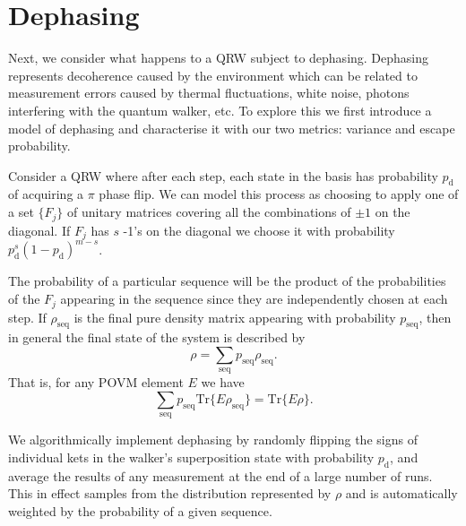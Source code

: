 \documentclass[aps,pra,twocolumn,amsmath,amssymb,nofootinbib,superscriptaddress]{revtex4}
\begin{document}

\section{Dephasing}

Next, we consider what happens to a QRW subject to dephasing. Dephasing represents decoherence caused by the environment which can be related to measurement errors caused by thermal fluctuations, white noise, photons interfering with the quantum walker, etc. To explore this we first introduce a model of dephasing and characterise it with our two metrics: variance and escape probability. 

Consider a QRW where after each step, each state in the basis has probability $p_{\mathrm{d}}$ of acquiring a $\pi$ phase flip. We can model this process as choosing to apply one of a set $\{F_j\}$ of unitary matrices covering all the combinations of $\pm 1$ on the diagonal. If $F_j$ has $s$ -1's on the diagonal we choose it with probability $p_{\mathrm{d}}^s(1-p_{\mathrm{d}})^{m-s}$. 

The probability of a particular sequence will be the product of the probabilities of the $F_j$ appearing in the sequence since they are independently chosen at each step. If $\rho_\mathrm{seq}$ is the final pure density matrix appearing with probability $p_\mathrm{seq}$, then in general the final state of the system is described by
\begin{equation}
    \rho = \sum_\mathrm{seq} p_\mathrm{seq} \rho_\mathrm{seq}.
\end{equation}
That is, for any POVM element $E$ we have 
\begin{equation}
    \sum_\mathrm{seq} p_\mathrm{seq} \mathrm{Tr}\{E \rho_\mathrm{seq}\} = \mathrm{Tr}\{E \rho\}.
\end{equation}

We algorithmically implement dephasing by randomly flipping the signs of individual kets in the walker's superposition state with probability $p_{\mathrm{d}}$, and average the results of any measurement at the end of a large number of runs. This in effect samples from the  distribution represented by $\rho$ and is automatically weighted by the probability of a given sequence. 
\end{document}
